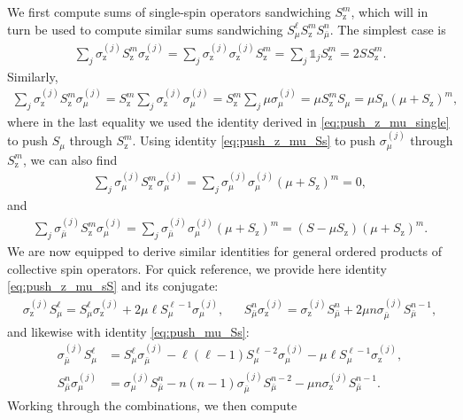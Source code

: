 \documentclass[aps,notitlepage,nofootinbib,11pt]{revtex4-1}
\newcommand{\p}[1]{\left(#1\right)} %
\newcommand{\z}{\text{z}}
\newcommand{\bmu}{{\bar\mu}}
\newcommand{\1}{\mathds{1}}
\begin{document}
We first compute sums of single-spin operators sandwiching $S_\z^m$,
which will in turn be used to compute similar sums sandwiching
$S_\mu^\ell S_\z^m S_\bmu^n$.  The simplest case is
\begin{align}
  \sum_j \sigma_\z^{(j)} S_\z^m \sigma_\z^{(j)}
  = \sum_j \sigma_\z^{(j)} \sigma_\z^{(j)} S_\z^m
  = \sum_j \1_j S_\z^m
  = 2 S S_\z^m.
\end{align}
Similarly,
\begin{align}
  \sum_j \sigma_\z^{(j)} S_\z^m \sigma_\mu^{(j)}
  = S_\z^m \sum_j \sigma_\z^{(j)} \sigma_\mu^{(j)}
  = S_\z^m \sum_j \mu \sigma_\mu^{(j)}
  = \mu S_\z^m S_\mu
  = \mu S_\mu \p{\mu+S_\z}^m,
\end{align}
where in the last equality we used the identity derived in
\eqref{eq:push_z_mu_single} to push $S_\mu$ through $S_\z^m$.  Using
identity \eqref{eq:push_z_mu_Ss} to push $\sigma_\mu^{(j)}$ through
$S_\z^m$, we can also find
\begin{align}
  \sum_j \sigma_\mu^{(j)} S_\z^m \sigma_\mu^{(j)}
  = \sum_j \sigma_\mu^{(j)} \sigma_\mu^{(j)} \p{\mu+S_\z}^m
  = 0,
\end{align}
and
\begin{align}
  \sum_j \sigma_\bmu^{(j)} S_\z^m \sigma_\mu^{(j)}
  = \sum_j \sigma_\bmu^{(j)} \sigma_\mu^{(j)} \p{\mu+S_\z}^m
  = \p{S-\mu S_\z} \p{\mu+S_\z}^m.
\end{align}
We are now equipped to derive similar identities for general ordered
products of collective spin operators.  For quick reference, we
provide here identity \eqref{eq:push_z_mu_sS} and its conjugate:
\begin{align}
  \sigma_\z^{(j)} S_\mu^\ell
  = S_\mu^\ell \sigma_\z^{(j)} + 2\mu \ell S_\mu^{\ell-1}\sigma_\mu^{(j)},
  &&
  S_\bmu^n \sigma_\z^{(j)}
  = \sigma_\z^{(j)} S_\bmu^n + 2\mu n \sigma_\bmu^{(j)} S_\bmu^{n-1},
\end{align}
and likewise with identity \eqref{eq:push_mu_Ss}:
\begin{align}
  \sigma_\bmu^{(j)} S_\mu^\ell
  &= S_\mu^\ell \sigma_\bmu^{(j)}
  - \ell \p{\ell-1} S_\mu^{\ell-2} \sigma_\mu^{(j)}
  - \mu \ell S_\mu^{\ell-1} \sigma_\z^{(j)}, \\
  S_\bmu^n \sigma_\mu^{(j)}
  &= \sigma_\mu^{(j)} S_\bmu^n
  - n \p{n-1} \sigma_\bmu^{(j)} S_\bmu^{n-2}
  - \mu n \sigma_\z^{(j)} S_\bmu^{n-1}.
\end{align}
Working through the combinations, we then compute
\end{document}
